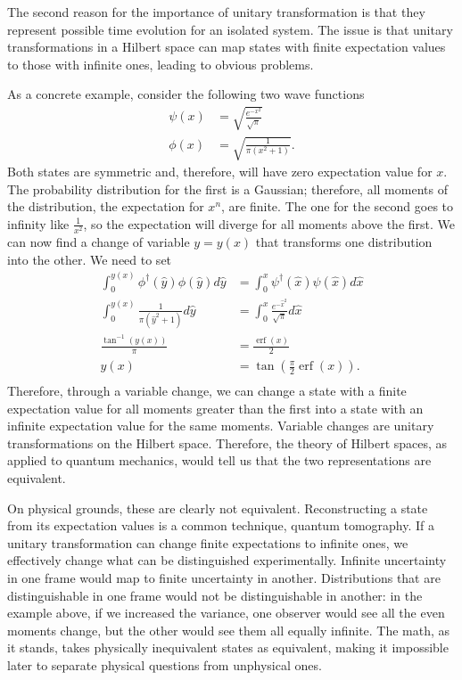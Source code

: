 \documentclass[10pt,twocolumn, nofootinbib]{revtex4-2}
\DeclareMathOperator{\erf}{erf}
\begin{document}
The second reason for the importance of unitary transformation is that they represent possible time evolution for an isolated system. The issue is that unitary transformations in a Hilbert space can map states with finite expectation values to those with infinite ones, leading to obvious problems.

As a concrete example, consider the following two wave functions
\begin{align}
\psi(x) &= \sqrt{\frac{e^{-x^2}}{\sqrt{\pi}}} \\
\phi(x) &= \sqrt{\frac{1}{\pi(x^2 + 1)}}.
\end{align}
Both states are symmetric and, therefore, will have zero expectation value for $x$. The probability distribution for the first is a Gaussian; therefore, all moments of the distribution, the expectation for $x^n$, are finite. The one for the second goes to infinity like $\frac{1}{x^2}$, so the expectation will diverge for all moments above the first. We can now find a change of variable $y=y(x)$ that transforms one distribution into the other. We need to set
\begin{equation}
\begin{aligned}
\int_{0}^{y(x)} \phi^\dagger(\hat{y}) \phi(\hat{y}) d\hat{y} &= \int_{0}^{x} \psi^\dagger(\hat{x}) \psi(\hat{x}) d\hat{x} \\
\int_{0}^{y(x)} \frac{1}{\pi(\hat{y}^2 + 1)} d\hat{y} &= \int_{0}^{x} \frac{e^{-\hat{x}^2}}{\sqrt{\pi}} d\hat{x} \\
\frac{\tan^{-1}(y(x))}{\pi} &= \frac{\erf(x)}{2} \\
y(x) &= \tan \left(\frac{\pi}{2}\erf(x)\right). \\
\end{aligned}
\end{equation}
Therefore, through a variable change, we can change a state with a finite expectation value for all moments greater than the first into a state with an infinite expectation value for the same moments. Variable changes are unitary transformations on the Hilbert space. Therefore, the theory of Hilbert spaces, as applied to quantum mechanics, would tell us that the two representations are equivalent.

On physical grounds, these are clearly not equivalent. Reconstructing a state from its expectation values is a common technique, quantum tomography.\cite{banaszek2013focus} If a unitary transformation can change finite expectations to infinite ones, we effectively change what can be distinguished experimentally. Infinite uncertainty in one frame would map to finite uncertainty in another. Distributions that are distinguishable in one frame would not be distinguishable in another: in the example above, if we increased the variance, one observer would see all the even moments change, but the other would see them all equally infinite. The math, as it stands, takes physically inequivalent states as equivalent, making it impossible later to separate physical questions from unphysical ones.
\end{document}
